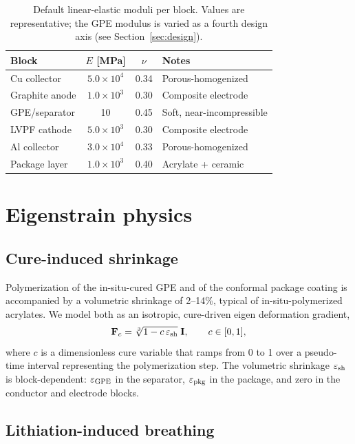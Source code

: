 \documentclass[11pt,letterpaper]{article}
\begin{document}
\begin{table}[H]
\centering
\caption{Default linear-elastic moduli per block.  Values are
representative; the GPE modulus is varied as a fourth design axis (see
Section~\ref{sec:design}).}
\label{tab:moduli}
\begin{tabular}{lccl}
\toprule
Block          & $E$ [MPa] & $\nu$ & Notes \\
\midrule
Cu collector   & $5.0\times 10^{4}$ & 0.34 & Porous-homogenized \\
Graphite anode & $1.0\times 10^{3}$ & 0.30 & Composite electrode \\
GPE/separator  & 10                 & 0.45 & Soft, near-incompressible \\
LVPF cathode   & $5.0\times 10^{3}$ & 0.30 & Composite electrode \\
Al collector   & $3.0\times 10^{4}$ & 0.33 & Porous-homogenized \\
Package layer  & $1.0\times 10^{3}$ & 0.40 & Acrylate + ceramic \\
\bottomrule
\end{tabular}
\end{table}

\section{Eigenstrain physics}

\subsection{Cure-induced shrinkage}

Polymerization of the in-situ-cured GPE and of the conformal package
coating is accompanied by a volumetric shrinkage of 2--14\%, typical
of in-situ-polymerized acrylates.  We model both as an isotropic,
cure-driven eigen deformation gradient,
\begin{equation}
\mathbf{F}_c = \sqrt[3]{1 - c\,\varepsilon_{\rm sh}}\;\mathbf{I},
\qquad c \in [0,1],
\end{equation}
where $c$ is a dimensionless cure variable that ramps from 0 to 1 over
a pseudo-time interval representing the polymerization step.  The
volumetric shrinkage $\varepsilon_{\rm sh}$ is block-dependent:
$\varepsilon_{\rm GPE}$ in the separator, $\varepsilon_{\rm pkg}$ in
the package, and zero in the conductor and electrode blocks.

\subsection{Lithiation-induced breathing}
\end{document}
